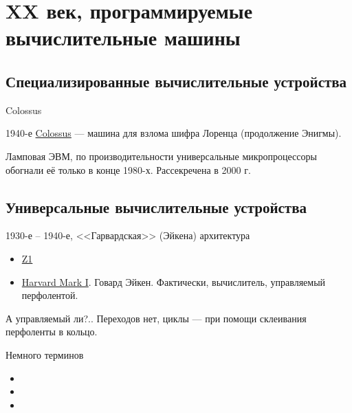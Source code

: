 \documentclass[xetex,aspectratio=43]{beamer}
\begin{document}
\section{XX век, программируемые вычислительные машины}

\subsection{Специализированные вычислительные устройства}

\begin{frame}{Colossus}

		1940-е \href{https://en.wikipedia.org/wiki/Colossus_computer}{Colossus}
		--- машина для взлома шифра Лоренца (продолжение Энигмы).

		Ламповая ЭВМ, по производительности универсальные микропроцессоры
		обогнали её только в конце 1980-х. Рассекречена в 2000 г.

\end{frame}

\subsection{Универсальные вычислительные устройства}

\begin{frame}{1930-е -- 1940-е, <<Гарвардская>> (Эйкена) архитектура}
		\begin{itemize}
			\item
			\href{https://en.wikipedia.org/wiki/Z1_(computer)}{Z1}
		\pause
			\item
			\href{https://en.wikipedia.org/wiki/Harvard_Mark_I}{Harvard Mark I}.
			Говард Эйкен. Фактически, вычислитель, управляемый перфолентой.
		\end{itemize}

		\begin{figure}
			
		\end{figure}

		\pause
		А управляемый ли?.. Переходов нет, циклы --- при помощи склеивания перфоленты в кольцо.
\end{frame}

\begin{frame}{Немного терминов}
	\begin{itemize}
		\item
		\item
		\item
	\end{itemize}
\end{frame}
\end{document}
